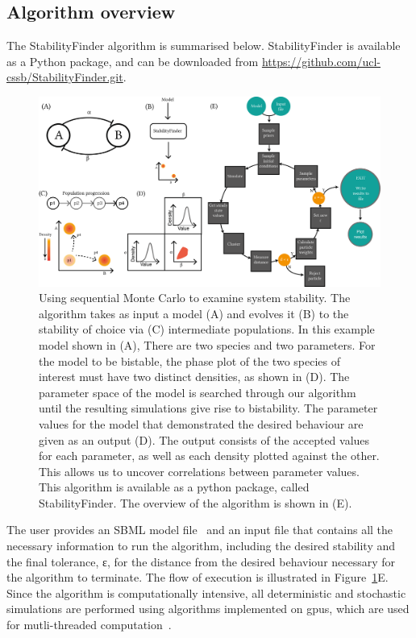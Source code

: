 \subsection{Algorithm overview}
\label{sec:Alg_overview}
The StabilityFinder algorithm is summarised below. StabilityFinder is available as a Python package, and can be downloaded from \url{https://github.com/ucl-cssb/StabilityFinder.git}. 

\begin{figure}[h]
\begin{center}
\includegraphics[scale=0.9]{../../chapters/chapterStabilityFinder/images/SF_algo_overv.png}
\caption[StabilityFinder algorithm overview]{\label{fig:fig1}Using sequential Monte Carlo to examine system stability. The algorithm takes as input a model (A) and evolves it (B) to the stability of choice via (C) intermediate populations. In this example model shown in (A), There are two species and two parameters. For the model to be bistable, the phase plot of the two species of interest must have two distinct densities, as shown in (D). The parameter space of the model is searched through our algorithm until the resulting simulations give rise to bistability. The parameter values for the model that demonstrated the desired behaviour are given as an output (D). The output consists of the accepted values for each parameter, as well as each density plotted against the other. This allows us to uncover correlations between parameter values. This algorithm is available as a python package, called StabilityFinder. The overview of the algorithm is shown in (E).}
\end{center}
\end{figure}
\clearpage

The user provides an SBML model file~\autocite{Finney:2003vk, Hucka:2004wh} and an input file that contains all the necessary information to run the algorithm, including the desired stability and the final tolerance, ε, for the distance from the desired behaviour necessary for the algorithm to terminate. The flow of execution is illustrated in Figure~\ref{fig:fig1}E. Since the algorithm is computationally intensive, all deterministic and stochastic simulations are performed using algorithms implemented on \acrfull{gpu}s, which are used for mutli-threaded computation~\autocite{Kirk:2010we}.


